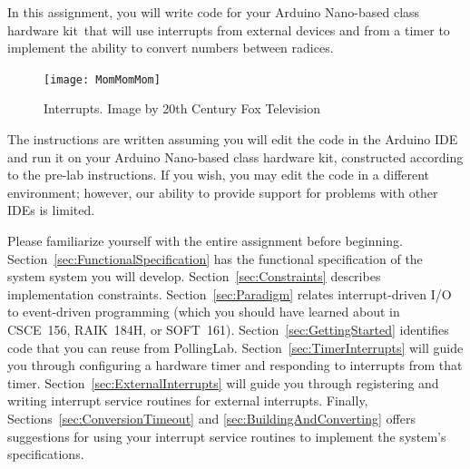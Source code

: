 

\usepackage{enumitem}
\usepackage{graphicx}
\usepackage{addfont}
\usepackage{subfig}
\usepackage{multicol}




\renewcommand{\labnumber}{9}
\renewcommand{\labname}{Using Interrupt-Driven Input/Output}
\renewcommand{\shortlabname}{interrupt-driven i/o -- interruptlab}
\renewcommand{\collaborationrules}{\individualeffort}
\renewcommand{\duedate}{Week of April 18, Before the start of your lab section}
\newcommand{\nano}{Arduino Nano}
\renewcommand{\runtimeenvironment}{your \nano-based class hardware kit}

\newcommand{\cstwo}{CSCE~156, RAIK~184H, or SOFT~161}

\startdocument

In this assignment, you will write code for \runtimeenvironment\ that will use
interrupts from external devices and from a timer to implement the ability to
convert numbers between radices.

\begin{figure}[h]
    \centering
    \texttt{[image: MomMomMom]}
    \caption{Interrupts. \tiny Image by 20th Century Fox Television}
\end{figure}

The instructions are written assuming you will edit the code in the Arduino IDE
and run it on \runtimeenvironment, constructed according to the pre-lab
instructions. If you wish, you may edit the code in a different environment;
however, our ability to provide support for problems with other IDEs is limited.

Please familiarize yourself with the entire assignment before beginning.
Section~\ref{sec:FunctionalSpecification} has the functional specification of
the system system you will develop. Section~\ref{sec:Constraints} describes
implementation constraints. Section~\ref{sec:Paradigm} relates interrupt-driven
I/O to event-driven programming (which you should have learned about in \cstwo).
Section~\ref{sec:GettingStarted} identifies code that you can reuse from PollingLab.
Section~\ref{sec:TimerInterrupts} will guide you through configuring a hardware
timer and responding to interrupts from that timer.
Section~\ref{sec:ExternalInterrupts} will guide you through registering and writing
interrupt service routines for external interrupts. Finally,
Sections~\ref{sec:ConversionTimeout} and \ref{sec:BuildingAndConverting} offers
suggestions for using your interrupt service routines to implement the system's
specifications.

